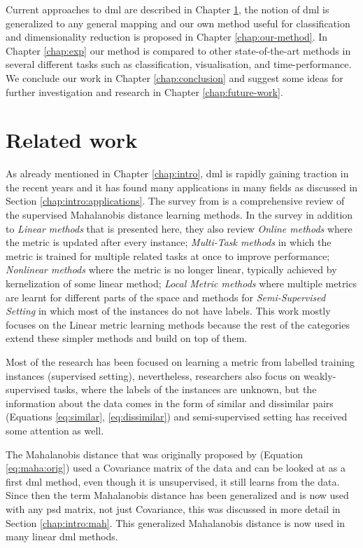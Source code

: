 \documentclass[12pt,a4paper]{report}
\begin{document}
Current approaches to \acl{dml} are described in Chapter \ref{chap:rw}, the notion of \ac{dml} is generalized to any general mapping and our own method useful for classification and dimensionality reduction is proposed in Chapter \ref{chap:our-method}. In Chapter \ref{chap:exp} our method is compared to other state-of-the-art methods in several different tasks such as classification, visualisation, and time-performance. We conclude our work in Chapter \ref{chap:conclusion} and suggest some ideas for further investigation and research in Chapter \ref{chap:future-work}.


\chapter{Related work} \label{chap:rw}

As already mentioned in Chapter \ref{chap:intro}, \acl{dml} is rapidly gaining traction in the recent years and it has found many applications in many fields as discussed in Section \ref{chap:intro:applications}. The survey from \citep{bellet2013survey} is a comprehensive review of the supervised Mahalanobis distance learning methods. In the survey in addition to \textit{Linear methods} that is presented here, they also review \textit{Online methods} where the metric is updated after every instance; \textit{Multi-Task methods} in which the metric is trained for multiple related tasks at once to improve performance; \textit{Nonlinear methods} where the metric is no longer linear, typically achieved by kernelization of some linear method; \textit{Local Metric methods} where multiple metrics are learnt for different parts of the space and methods for \textit{Semi-Supervised Setting} in which most of the instances do not have labels. This work mostly focuses on the Linear metric learning methods because the rest of the categories extend these simpler methods and build on top of them.

Most of the research has been focused on learning a metric from labelled training instances (supervised setting), nevertheless, researchers also focus on weakly-supervised tasks, where the labels of the instances are unknown, but the information about the data comes in the form of similar and dissimilar pairs (Equations \ref{eq:similar}, \ref{eq:dissimilar}) and semi-supervised setting has received some attention as well.

The Mahalanobis distance that was originally proposed by \citep{mahalanobis1936generalized} (Equation \ref{eq:maha:orig}) used a Covariance matrix of the data and can be looked at as a first \acl{dml} method, even though it is unsupervised, it still learns from the data. Since then the term Mahalanobis distance has been generalized and is now used with any \ac{psd} matrix, not just Covariance, this was discussed in more detail in Section \ref{chap:intro:mah}. This generalized Mahalanobis distance is now used in many linear \acl{dml} methods.
\end{document}
